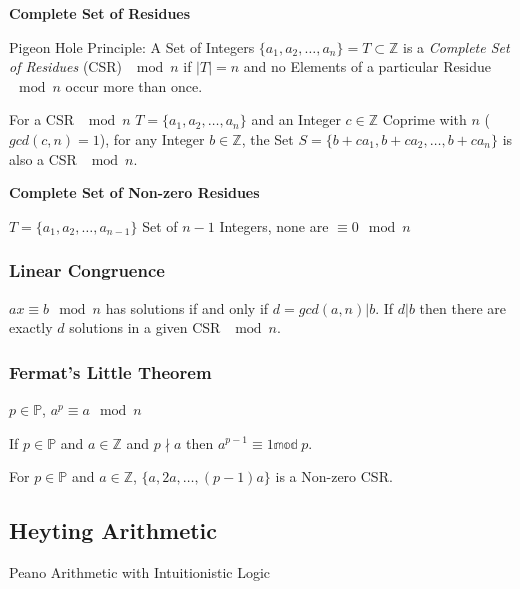 \textbf{Complete Set of Residues}

Pigeon Hole Principle: A Set of Integers $\{a_1, a_2, \ldots, a_n\} =
T \subset \mathbb{Z}$ is a \emph{Complete Set of Residues} (CSR)
$\mod n$ if $|T| = n$ and no Elements of a particular Residue
$\mod n$ occur more than once.

For a CSR $\mod n$ $T = \{a_1, a_2, \ldots, a_n\}$ and an
Integer $c \in \mathbb{Z}$ Coprime with $n$ ($gcd(c,n) = 1$), for any
Integer $b \in \mathbb{Z}$, the Set $S = \{b + ca_1, b + ca_2, \ldots,
b + ca_n \}$ is also a CSR $\mod n$.



\textbf{Complete Set of Non-zero Residues}

$T = \{ a_1, a_2, \ldots, a_{n-1} \}$ Set of $n-1$ Integers, none are
$\equiv 0 \mod n$



\subsubsection{Linear Congruence}\label{sec:linear_congruence}

$ax \equiv b \mod n$ has solutions if and only if $d =
gcd(a,n) | b$. If $d|b$ then there are exactly $d$ solutions in a
given CSR $\mod n$.



\subsubsection{Fermat's Little Theorem}\label{sec:fermat_little}

$p \in \mathbb{P}$, $a^p \equiv a \mod n$

If $p \in \mathbb{P}$ and $a \in \mathbb{Z}$ and $p \nmid a$ then $a^{p-1}
\equiv 1 \mathbb{mod}\;p$.

For $p \in \mathbb{P}$ and $a \in \mathbb{Z}$, $\{ a, 2a, \ldots,
(p-1)a \}$ is a Non-zero CSR.



\subsection{Heyting Arithmetic}\label{sec:heyting_arithmetic}

Peano Arithmetic with Intuitionistic Logic



